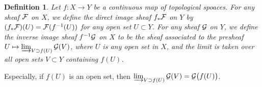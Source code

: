 \documentclass[9pt]{extarticle}
\theoremstyle{plain}
\newtheorem{defi}{Definition}
\begin{document}
\begin{defi}
	Let $f:X\to Y$ be a continuous map of topological spoaces. For any sheaf $\mathcal{F}$ on $X$, we define the direct image sheaf $f_*\mathcal{F}$ on $Y$ by $(f_*\mathcal{F})(U)=\mathcal{F}(f^{-1}(U))$ for any open set $U\subset Y$. For any sheaf $\mathcal{G}$ on $Y$, we define the inverse image sheaf $f^{-1}\mathcal{G}$ on $X$ to be the sheaf associated to the presheaf $U\mapsto \varinjlim_{V \supset f(U)}\mathcal{G}(V)$, where $U$ is any open set in $X$, and the limit is taken over all open sets $V\subset Y$ containing $f(U)$. 
\end{defi}
Especially, if $f(U)$ is an open set, then $\varinjlim_{V \supset f(U)}\mathcal{G}(V)=\mathcal{G}\bigl(f(U)\bigr)$.
\end{document}
